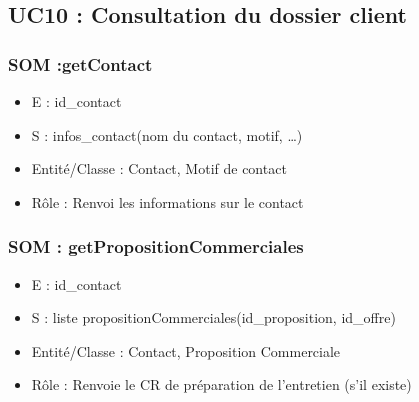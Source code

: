 \subsection{UC10 : Consultation du dossier client}

\subsubsection{SOM :getContact}
	\begin{itemize}
		\item E : id\_contact
		\item S : infos\_contact(nom du contact, motif, …)
		\item Entité/Classe : Contact, Motif de contact
		\item Rôle : Renvoi les informations sur le contact
	\end{itemize}

\subsubsection{SOM : getPropositionCommerciales}
	\begin{itemize}
		\item E : id\_contact
		\item S : liste propositionCommerciales(id\_proposition, id\_offre)
		\item Entité/Classe : Contact, Proposition Commerciale
		\item Rôle : Renvoie le CR de préparation de l’entretien (s’il existe)
	\end{itemize}
